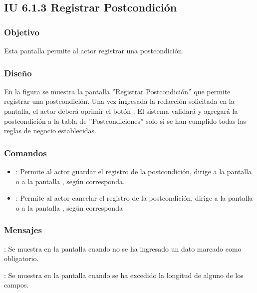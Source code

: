 \subsection{IU 6.1.3 Registrar Postcondición}

\subsubsection{Objetivo}
	Esta pantalla permite al actor registrar una postcondición.
\subsubsection{Diseño}
	En la figura  se muestra la pantalla ''Registrar Postcondición'' que permite registrar una postcondición. Una vez ingresada la redacción solicitada en la pantalla, el actor deberá oprimir el botón  . El sistema validará y agregará la postcondición a la tabla de ''Postcondiciones'' solo si se han cumplido todas las reglas de negocio establecidas.

\subsubsection{Comandos}
\begin{itemize}
	\item {}: Permite al actor guardar el registro de la postcondición, dirige a la pantalla  o a la pantalla , según corresponda.
	\item {}: Permite al actor cancelar el registro de la postcondición, dirige a la pantalla  o a la pantalla , según corresponda
\end{itemize}

\subsubsection{Mensajes}

\begin{Citemize}
	\item {}: Se muestra en la pantalla  cuando no se ha ingresado un dato marcado como obligatorio.
	\item {}: Se muestra en la pantalla  cuando se ha excedido la longitud de alguno de los campos.
\end{Citemize}
